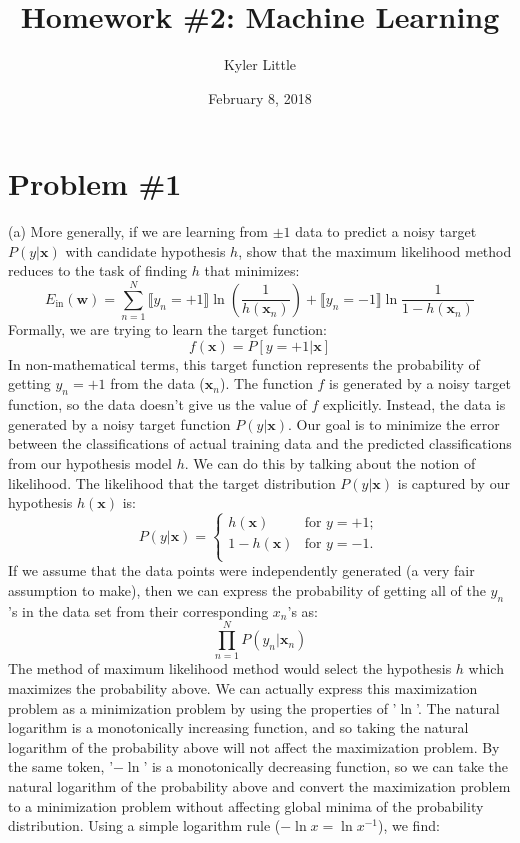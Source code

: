 \documentclass[12pt]{article}
\author{Kyler Little\vspace{-0.6cm}}
\title{Homework \#2: Machine Learning\vspace{-0.3cm}}
\date{February 8, 2018\vspace{-0.7cm}}
\begin{document}
	\maketitle
	\section*{Problem \#1}
	(a) More generally, if we are learning from $\pm1$ data to predict a noisy target $P({y|\boldsymbol{x}})$ with candidate hypothesis $h$, show that the maximum likelihood method reduces to the task of finding $h$ that minimizes:
	\begin{equation*}
	E_{\text{in}}(\boldsymbol{w})= \sum_{n=1}^{N} \llbracket y_n=+1\rrbracket \ln(\frac{1}{h(\boldsymbol{x}_n)}) + \llbracket y_n=-1\rrbracket \ln \frac{1}{1-h(\boldsymbol{x}_n)}
	\end{equation*}
	Formally, we are trying to learn the target function:
	\begin{equation*}
	f(\boldsymbol{x}) = P[y=+1|\boldsymbol{x}]
	\end{equation*} 
	In non-mathematical terms, this target function represents the probability of getting $y_n=+1$ from the data ($\boldsymbol{x}_n$). The function $f$ is generated by a noisy target function, so the data doesn't give us the value of $f$ explicitly. Instead, the data is generated by a noisy target function $P(y|\boldsymbol{x})$. Our goal is to minimize the error between the classifications of actual training data and the predicted classifications from our hypothesis model $h$. We can do this by talking about the notion of likelihood. The likelihood that the target distribution $P(y|\boldsymbol{x})$ is captured by our hypothesis $h(\boldsymbol{x})$ is:
	\begin{equation*}
	P(y|\boldsymbol{x}) = 
	\begin{cases}
	h(\boldsymbol{x}) & \text{for } y=+1; \\
	1-h(\boldsymbol{x}) & \text{for } y=-1. \\
	\end{cases}
	\end{equation*}
	If we assume that the data points were independently generated (a very fair assumption to make), then we can express the probability of getting all of the $y_n$'s in the data set from their corresponding $x_n$'s as:
	\begin{equation*}
	\prod_{n=1}^{N} P(y_n|\boldsymbol{x}_n) 
	\end{equation*}
	The method of maximum likelihood method would select the hypothesis $h$ which maximizes the probability above. We can actually express this maximization problem as a minimization problem by using the properties of '$\ln$'. The natural logarithm is a monotonically increasing function, and so taking the natural logarithm of the probability above will not affect the maximization problem. By the same token, '$-\ln$' is a monotonically decreasing function, so we can take the natural logarithm of the probability above and convert the maximization problem to a minimization problem without affecting global minima of the probability distribution. Using a simple logarithm rule ($-\ln x =\ln x^{-1}$), we find:
\end{document}
